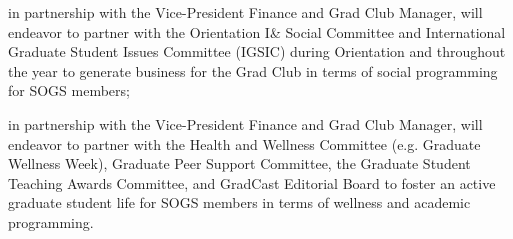 \begin{longenum}[ label*=\thesubsection.\arabic*., align=left]
\begin{longenum}[ label*=\arabic*., align=left]
\begin{longenum}[ label*=\arabic*., align=left]
		\end{longenum}
	\item in partnership with the Vice-President Finance and Grad Club Manager, will endeavor to partner with the Orientation I\& Social Committee and International Graduate Student Issues Committee (IGSIC) during Orientation and throughout the year to generate business for the Grad Club in terms of social programming for SOGS members;
	\item in partnership with the Vice-President Finance and Grad Club Manager, will endeavor to partner with the Health and Wellness Committee (e.g. Graduate Wellness Week), Graduate Peer Support Committee, the Graduate Student Teaching Awards Committee, and GradCast Editorial Board to foster an active graduate student life for SOGS members in terms of wellness and academic programming.
	\end{longenum}
\end{longenum}